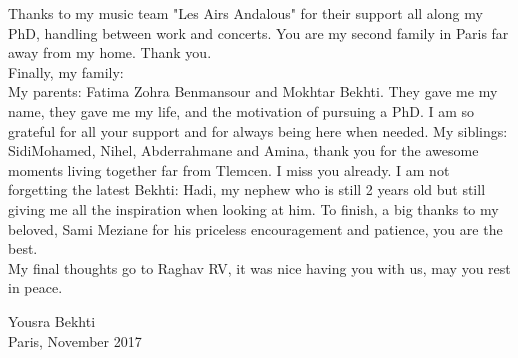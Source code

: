 \begin{acknowledgements}
\vspace{-10pt}
Thanks to my music team "Les Airs Andalous" for their support all along my PhD, handling between work and concerts. You are my second family in Paris far away from my home. Thank you.\\

\vspace{-10pt}
Finally, my family: \\
My parents: Fatima Zohra Benmansour and Mokhtar Bekhti. They gave me my name, they gave me my life, and the motivation of pursuing a PhD. I am so grateful for all your support and for always being here when needed. My siblings: SidiMohamed, Nihel, Abderrahmane and Amina, thank you for the awesome moments living together far from Tlemcen. I miss you already. I am not forgetting the latest Bekhti: Hadi, my nephew who is still 2 years old but still giving me all the inspiration when looking at him. To finish, a big thanks to my beloved, Sami Meziane for his priceless encouragement and patience, you are the best.\\

\vspace{-9pt}
My final thoughts go to Raghav RV, it was nice having you with us, may you rest in peace.

\vspace{-5pt}
{\raggedleft Yousra Bekhti\\}%
{\raggedleft Paris, November 2017\\}
\end{acknowledgements}